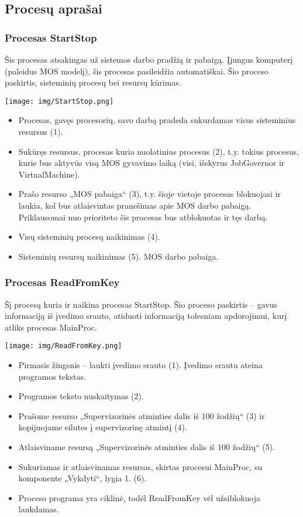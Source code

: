 \subsection{Procesų aprašai}

\subsubsection{Procesas StartStop}
Šis procesas atsakingas už sistemos darbo pradžią ir pabaigą. Įjungus komputerį (paleidus MOS modelį), šis procesas pasileidžia automatiškai. Šio proceso paskirtis, sisteminių procesų bei resursų kūrimas.

\texttt{[image: img/StartStop.png]}

	\begin{itemize}
		\item Procesas, gavęs procesorių, savo darbą pradeda sukurdamas visus sisteminius resursus (1). 
		\item Sukūręs resursus, procesas kuria nuolatinius procesus (2), t.y. tokius procesus, kurie bus aktyvūs visą MOS gyvavimo laiką (visi, išskyrus JobGovernor ir VirtualMachine).
		\item Prašo resurso „MOS pabaiga“ (3), t.y. šioje vietoje procesas blokuojasi ir laukia, kol bus atlaisvintas pranešimas apie MOS darbo pabaigą. Priklausomai nuo prioriteto šis procesas bus atblokuotas ir tęs darbą.
		\item Visų sisteminių procesų naikinimas (4). 
		\item Sisteminių resursų naikinimas (5). MOS darbo pabaiga.
	\end{itemize}
\subsubsection{Procesas ReadFromKey}
Šį procesą kuria ir naikina procesas StartStop. Šio proceso paskirtis – gavus informaciją iš įvedimo srauto, atiduoti informaciją tolesniam apdorojimui, kurį atliks procesas MainProc.

\texttt{[image: img/ReadFromKey.png]}

	\begin{itemize}
		\item Pirmasis žingsnis – laukti įvedimo srauto (1).  Įvedimo srautu ateina programos tekstas.
		\item Programos teksto nuskaitymas (2).
		\item Prašome resurso „Supervizorinės atminties dalis iš 100 žodžių“ (3) ir kopijuojame eilutes į supervizorinę atmintį (4).
		\item Atlaisviname resursą „Supervizorinės atminties dalis iš 100 žodžių“ (5).
		\item Sukuriamas ir atlaisvinamas resursas, skirtas procesui MainProc, su komponente „Vykdyti“, lygia 1. (6). 
		\item Proceso programa yra ciklinė, todėl ReadFromKey vėl užsiblokuoja laukdamas.
	\end{itemize}
